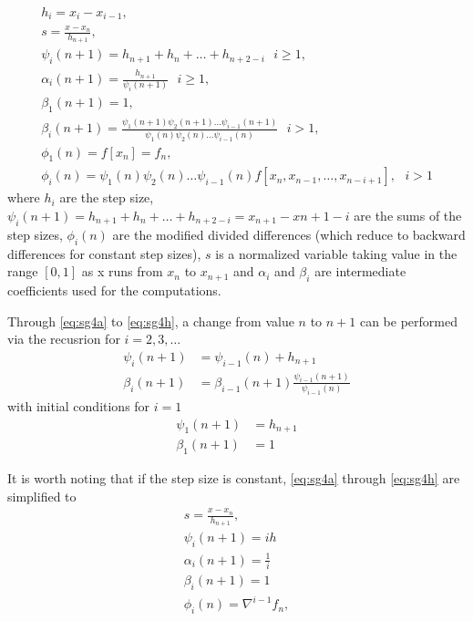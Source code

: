\begin{gather}
  h_i  = x_i - x_{i-1}, \label{eq:sg4a}\\
  s    = \frac{x - x_n}{h_{n+1}}, \label{eq:sg4b}\\
  \psi _i (n+1)   = h_{n+1} + h_{n} + \dots + h_{n+2-i} \text{ } i \ge 1, \label{eq:sg4c}\\
  \alpha _i (n+1) = \frac{h_{n+1}}{\psi _i (n+1)} \text{ } i \ge 1, \label{eq:sg4d}\\
  \beta _1 (n+1)  = 1, \label{eq:sg4e}\\
  \beta _i (n+1)  = \frac{\psi _1 (n+1) \psi _2 (n+1) \dots \psi _{i-1}(n+1)}{\psi _1 (n) \psi _2 (n) \dots \psi _{i-1}(n)} \text{ } i > 1, \label{eq:sg4f}\\
  \phi _1(n) = f[x_n] = f_n, \label{eq:sg4g}\\
  \phi _i(n) = \psi _1 (n) \psi _2 (n) \dots \psi _{i-1}(n) f[x_n,x_{n-1},\dots ,x_{n-i+1}], \text{ } i > 1 \label{eq:sg4h}
\end{gather}
where $h_i$ are the step size, 
$\psi _i(n+1) = h_{n+1} + h_{n} + \dots + h_{n+2-i} = x_{n+1}-x{n+1-i}$ are the 
sums of the step sizes, $\phi _{i}(n)$ are the modified divided differences (which 
reduce to backward differences for constant step sizes), $s$ is a normalized variable 
taking value in the range $[0,1]$ as x runs from $x_n$ to $x_{n+1}$ and $\alpha _i$ 
and $\beta _i$ are intermediate coefficients used for the computations.

Through \autoref{eq:sg4a} to \autoref{eq:sg4h}, a change from value $n$ to $n+1$ 
can be performed via the recusrion for $i=2,3,\dots$
\begin{equation}
  \begin{aligned}
    \psi _i(n+1)   &= \psi _{i-1}(n) + h_{n+1} \\
    \beta _i(n+1)  &= \beta _{i-1}(n+1) \frac{\psi _{i-1}(n+1)}{\psi _{i-1}(n)}
  \end{aligned}
\end{equation}
with initial conditions for $i=1$
\begin{equation}
  \begin{aligned}
    \psi _1(n+1)   &= h_{n+1} \\
    \beta _1(n+1)  &= 1
  \end{aligned}
\end{equation}

It is worth noting that if the step size is constant, \autoref{eq:sg4a} through 
\autoref{eq:sg4h} are simplified to
\begin{gather}
  s = \frac{x-x_n}{h_{n+1}} , \label{eq:sg4Ab}\\
  \psi _i (n+1)   = ih \label{eq:sg4Ac}\\
  \alpha _i (n+1) = \frac{1}{i} \label{eq:sg4Ad}\\
  \beta_i (n+1)   = 1 \label{eq:sg4Ae}\\
  \phi _i(n)      = \nabla ^{i-1} f_n, \label{eq:sg4g}
\end{gather}

